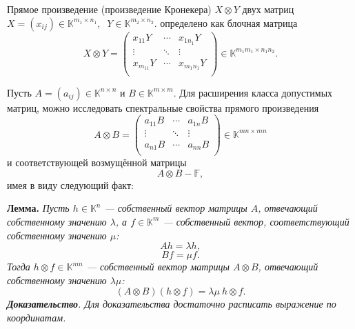 Прямое произведение (произведение Кронекера)
    \( X\otimes Y \)
    двух матриц
    \( X{=}(x_{ij}){\in}\mathbb{K}^{m_1{\times}n_1},\ \)
    \( Y{\in}\mathbb{K}^{m_2{\times}n_2} \).
    определено как блочная матрица
\[
    X\otimes Y =
    \begin{pmatrix}
        x_{11} Y & \cdots & x_{1n_1} Y \\
        \vdots   & \ddots & \vdots \\
        x_{m_11} Y & \cdots & x_{m_1n_1} Y \\
    \end{pmatrix}\in\mathbb{K}^{m_1m_1\times n_1n_2}.
    \]

Пусть \( A{=}(a_{ij}){\in}\mathbb{K}^{n\times n} \)
    и \( B\in\mathbb{K}^{m\times m} \).
Для расширения класса допустимых матриц,
    можно исследовать спектральные свойства прямого произведения
    \[
        A\otimes B = 
        \begin{pmatrix}
            a_{11} B & \cdots & a_{1n} B \\
            \vdots   & \ddots & \vdots \\
            a_{n1} B & \cdots & a_{nn} B \\
        \end{pmatrix}\in\mathbb{K}^{mn\times mn}
        \]
    и соответствующей возмущённой матрицы
    \begin{equation}\label{ksv:disturbkron}
        A\otimes B - \mathbb{F},
    \end{equation}
    имея в виду следующий факт:

\begingroup
\textbf{Лемма.}\itshape
    Пусть \( h\in\mathbb{K}^n \) --- собственный вектор матрицы \( A \),
    отвечающий собственному значению \( \lambda \),
    а \( f\in\mathbb{K}^m \) --- собственный вектор,
    соответствующий собственному значению \( \mu \):
    \[
        A h = \lambda h,
        \]
    \[
        B f = \mu f.
        \]
    Тогда \( h\otimes f \in \mathbb{K}^{mn} \)
    --- собственный вектор матрицы \( A\otimes B \),
    отвечающий собственному значению \( \lambda\mu \):
    \[
        (A\otimes B)(h\otimes f) = \lambda\mu\ h\otimes f.
        \]
\endgroup
\begingroup
\textbf{Доказательство}.
    Для доказательства достаточно расписать выражение по координатам.
\endgroup

